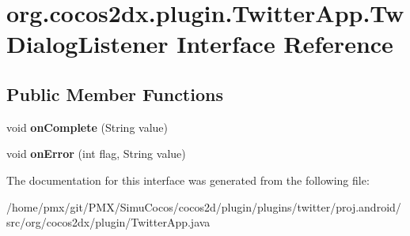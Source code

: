 \hypertarget{interfaceorg_1_1cocos2dx_1_1plugin_1_1TwitterApp_1_1TwDialogListener}{}\section{org.\+cocos2dx.\+plugin.\+Twitter\+App.\+Tw\+Dialog\+Listener Interface Reference}
\label{interfaceorg_1_1cocos2dx_1_1plugin_1_1TwitterApp_1_1TwDialogListener}
\subsection*{Public Member Functions}
\begin{DoxyCompactItemize}
\item 
\mbox{\label{interfaceorg_1_1cocos2dx_1_1plugin_1_1TwitterApp_1_1TwDialogListener_adc088500d401eaf74a363e4419ab74bb}} 
void {\bfseries on\+Complete} (String value)
\item 
\mbox{\label{interfaceorg_1_1cocos2dx_1_1plugin_1_1TwitterApp_1_1TwDialogListener_adca08c10cffe6505bb2b12eccfbd461a}} 
void {\bfseries on\+Error} (int flag, String value)
\end{DoxyCompactItemize}


The documentation for this interface was generated from the following file\+:\begin{DoxyCompactItemize}
\item 
/home/pmx/git/\+P\+M\+X/\+Simu\+Cocos/cocos2d/plugin/plugins/twitter/proj.\+android/src/org/cocos2dx/plugin/Twitter\+App.\+java\end{DoxyCompactItemize}
